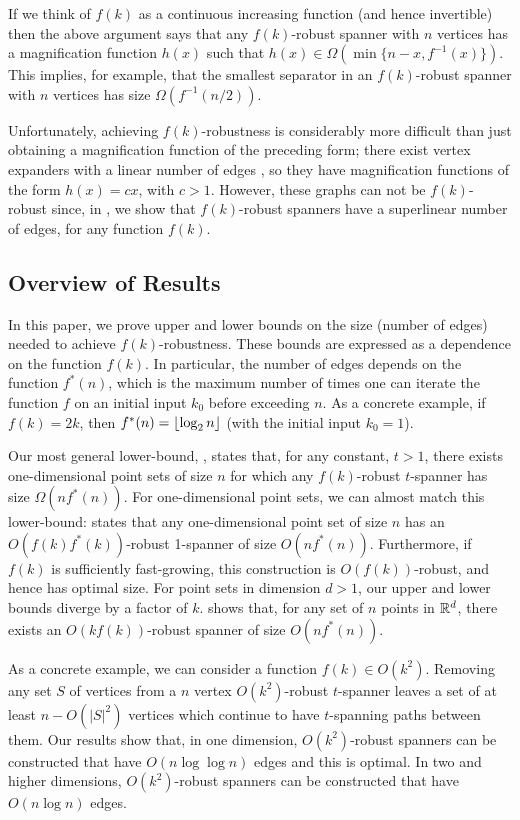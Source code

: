 \documentclass{patmorin}
\begin{document}
If we think of $f(k)$ as a continuous increasing function (and
hence invertible) then the above argument says that any $f(k)$-robust
spanner with $n$ vertices has a magnification function $h(x)$ such that
$h(x)\in\Omega(\min\{n-x,f^{-1}(x)\})$.  This implies, for example, that the
smallest separator in an $f(k)$-robust spanner with $n$ vertices has
size $\Omega(f^{-1}(n/2))$.

Unfortunately, achieving $f(k)$-robustness is considerably more
difficult than just obtaining a magnification function of the
preceding form; there exist vertex expanders with a linear number of
edges \cite{hlw06}, so they have magnification functions of the form
$h(x)=cx$, with $c>1$.  However, these graphs can not be $f(k)$-robust
since, in , we show that $f(k)$-robust
spanners have a superlinear number of edges, for any function $f(k)$.


\subsection{Overview of Results}

In this paper, we prove upper and lower bounds on the size (number of
edges) needed to achieve $f(k)$-robustness.
These bounds are expressed as a dependence on the function $f(k)$.
In particular, the number of edges depends on the function $f^*(n)$,
which is the maximum number of times one can iterate the function $f$ on
an initial input $k_0$ before exceeding $n$.  As a concrete example, if
$f(k)=2k$, then  $f^*(n)={\lfloor \log_2 n \rfloor}$ (with the initial input $k_0=1$).

Our most general lower-bound, , states
that, for any constant, $t>1$, there exists one-dimensional point
sets of size $n$ for which any $f(k)$-robust $t$-spanner has size
$\Omega(nf^*(n))$.  For one-dimensional point sets, we can almost match
this lower-bound:  states that any one-dimensional
point set of size $n$ has an $O(f(k)f^*(k))$-robust 1-spanner of size
$O(nf^*(n))$.  Furthermore, if $f(k)$ is sufficiently fast-growing,
this construction is $O(f(k))$-robust, and hence has optimal size.
For point sets in dimension $d>1$, our upper and lower bounds diverge
by a factor of $k$.   shows that, for any set of $n$ points
in $\mathbb{R}^d$, there exists an $O(kf(k))$-robust spanner of size $O(nf^*(n))$.

As a concrete example, we can consider a function $f(k)\in O(k^2)$.
Removing any set $S$ of vertices from a $n$ vertex $O(k^2)$-robust
$t$-spanner leaves a set of at least $n-O(|S|^2)$ vertices which continue
to have $t$-spanning paths between them.  Our results show that, in
one dimension, $O(k^2)$-robust spanners can be constructed that have
$O(n\log\log n)$ edges and this is optimal.  In two and higher dimensions,
$O(k^2)$-robust spanners can be constructed that have $O(n\log n)$ edges.
\end{document}
